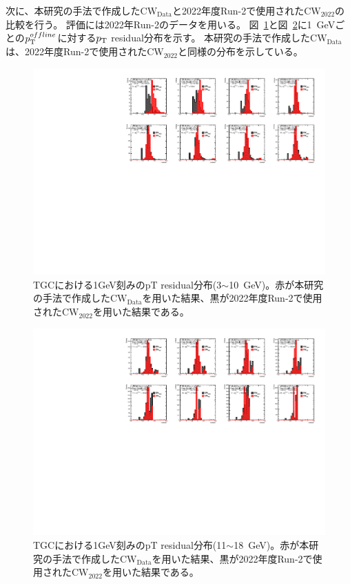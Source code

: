 次に、本研究の手法で作成した$\mathrm{CW_{Data}}$と2022年度Run-2で使用された$\mathrm{CW_{2022}}$の比較を行う。
評価には2022年Run-2のデータを用いる。
図~\ref{residual_Data_3_10}と図~\ref{residual_Data_11_18}に1~GeVごとの$p_{\rm{T}}^{offline}$に対する$p_{\rm{T}}$ residual分布を示す。
本研究の手法で作成した$\mathrm{CW_{Data}}$は、2022年度Run-2で使用された$\mathrm{CW_{2022}}$と同様の分布を示している。
\begin{figure}[htb]
  \centering
  \hspace*{-1cm}
  \includegraphics[clip, width=16cm]{fig/5/residual_Data_3_10.pdf}
  \caption{TGCにおける1GeV刻みのpT residual分布(3$\sim$10~GeV)。赤が本研究の手法で作成した$\mathrm{CW_{Data}}$を用いた結果、黒が2022年度Run-2で使用された$\mathrm{CW_{2022}}$を用いた結果である。}
  \label{residual_Data_3_10}
\end{figure}
\begin{figure}[htb]
  \centering
  \hspace*{-1cm}
  \includegraphics[clip, width=16cm]{fig/5/residual_Data_11_18.pdf}
  \caption{TGCにおける1GeV刻みのpT residual分布(11$\sim$18~GeV)。赤が本研究の手法で作成した$\mathrm{CW_{Data}}$を用いた結果、黒が2022年度Run-2で使用された$\mathrm{CW_{2022}}$を用いた結果である。}
  \label{residual_Data_11_18}
\end{figure}


